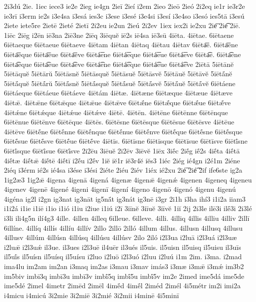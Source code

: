 {2i3dú
2ie.
1iec
iece3
ie2e
2ieg
ie4gn
2ieī
2ieí
i2em
2ieo
2ieō
2ieó
2i2eq
ie1r
ie3r2e
ie3rī
i3erm
ie2s
i3e4sa
i3esá
ies3c
i3ese
i3esé
i3e4si
i3esí
i3e4so
i3esó
ies5tā
i3esú
2iete
iete5re
2ietē
2ieté
2ietī
2i2eu
ie2un
2ieú
2i2ev
1iex
iex2i
ie2xu
2ie͞
2ie͡
2iē.
1iēc
2iēg
i2ēn
iē3na
2iē3ne
2iēq
3iēquĕ
iē2s
iē4sa
iē3sū
4iēta.
4iētae.
6iētaene
6iētaeque
6iētaeue
6iētaeve
4iētam
4iētan
4iētaq
4iētau
4iētav
6iēta͞e.
6iēta͞ene
6iēta͞eque
6iēta͞eue
6iēta͞eve
6iētá͞ene
6iētá͞eque
6iētá͞eue
6iētá͞eve
6iēta͡e.
6iēta͡ene
6iēta͡eque
6iēta͡eue
6iēta͡eve
6iētá͡ene
6iētá͡eque
6iētá͡eue
6iētá͡eve
2iētā
5iētānĕ
5iētāquĕ
5iētārŭ
5iētāsnĕ
5iētāsquĕ
5iētāsuĕ
5iētāsvĕ
5iētāuĕ
5iētāvĕ
5iētā́nĕ
5iētā́quĕ
5iētā́rŭ
5iētā́snĕ
5iētā́squĕ
5iētā́suĕ
5iētā́svĕ
5iētā́uĕ
5iētā́vĕ
6iētáene
6iētáeque
6iētáeue
6iētáeve
4iētám
4iētæ.
4iētæne
6iētæque
4iētæue
4iētæve
4iētǣ.
4iētǣne
6iētǣque
4iētǣue
4iētǣve
6iētǣ́ne
6iētǣ́que
6iētǣ́ue
6iētǣ́ve
4iētǽne
6iētǽque
4iētǽue
4iētǽve
4iētē.
4iētēn.
4iētēne
6iētēnne
6iētēnque
6iētēnue
6iētēnve
6iētēque
4iētēs.
6iētēsne
6iētēsque
6iētēsue
6iētēsve
4iētēue
4iētēve
6iētḗne
6iētḗnne
6iētḗnque
6iētḗnue
6iētḗnve
6iētḗque
6iētḗsne
6iētḗsque
6iētḗsue
6iētḗsve
6iētḗue
6iētḗve
4iētīs.
6iētīsne
6iētīsque
6iētīsue
6iētīsve
6iētī́sne
6iētī́sque
6iētī́sue
6iētī́sve
2i2ēu
3iēuĕ
2i2ēv
3iēvĕ
1iēx
3iḗc
2iḗg
iḗ2s
4iḗta
4iḗtā
4iḗtæ
4iḗtǣ
4iḗtē
4iḗtī
i2ḗu
i2ḗv
1iĕ
iĕ1r
iĕ3r4ĕ
iĕs3
1iéc
2iég
ié4gn
i2é1m
2iéne
2iéq
i3érm
ié2s
ié4sa
i3ése
i3ési
2iéte
2iéu
2iév
1iéx
ié2xu
2ié͞
2ié͡
2if
ife6ste
ig2a
1ig2æ3
1ig2ǣ
4igena
4igenā
4igená
4igenæ
4igenǣ
4igenǽ
4igenen
4igeneq
4igeneu
4igenev
4igenē
4igené
4igeni
4igenī
4igení
4igeno
4igenō
4igenó
4igenu
4igenú
4igéna
ig2l
i2gn
ig3nat
ig3nāt
ig5nā́t
ig3nát
ig3nē
i3gr
2i1h
i3ha
ihí3
i1i2a
iiam3
i1i2á
i1ie
i1iē
i1io
i1ió
i1iu
i2iue
i1iú
i2ī
3iīnĕ
3iīuĕ
3iīvĕ
1iĭ
2ij
2i3le
ilē3i
ilḗ3i
2i3lé
i3li
ili4g5n
ilí4g3
4ille.
4illen
4illeq
6illeue.
6illeve.
4illi.
4illiq
4illis
4illiu
4illiv
2illī
6illíne.
4illíq
4illís
4illíu
4illív
2illo
2illō
2illó
4illum
4illus.
4illusn
4illusq
4illusu
4illusv
4illúm
4illúsn
4illúsq
4illúsu
4illúsv
2ilo
2iló
i2l3ua
i2luā
i2l3uá
i2l3uæ
i2luǣ
i2l3uǽ
il3ue.
il3ues
i2l3uē
il4uēr
il3ués
il5uis.
il5uisn
il5uisq
il5uisu
il3uīs
il5uī́s
il5uísn
il5uísq
il5uísu
i2luo
i2luō
i2l3uó
i2luu
i2luú
i1m
2im.
i3ma.
i2mad
ima4lu
im2am
im2an
i3maq
im2as
i3mau
i3mav
imás3
i3mæ
i3mǣ
i3mǽ
im3b2
im5biv
imbī3q
imbī3u
imbī3v
imbī́5q
imbī́5u
imbī́5v
im2e
2imed
ime5dá
ime5de
ime5dé
2imel
4imetr
2imēd
2imēl
4imḗd
4imḗl
2iméd
2imél
4i5métr
im2i
imi2a
i4micu
i4micú
3i2mie
3i2miē
3i2mié
3i2mii
i4minē
4i5minī
}
